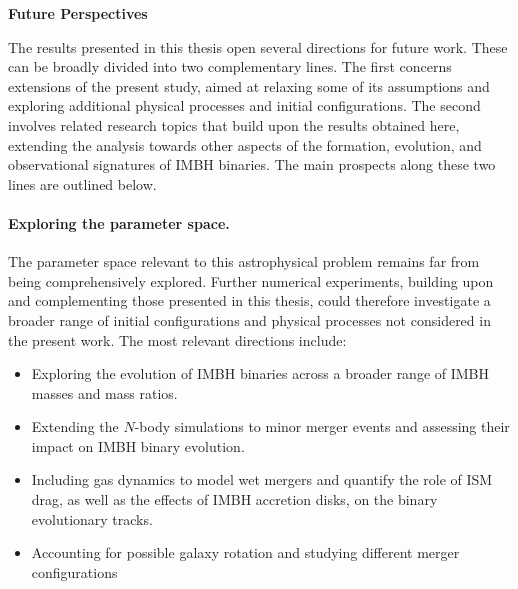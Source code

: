 \documentclass[12pt,twoside,openany]{book}
\begin{document}
\begin{center}
\textbf{Future Perspectives}
\end{center}
The results presented in this thesis open several directions for future work. These can be broadly divided into two complementary lines. The first concerns extensions of the present study, aimed at relaxing some of its assumptions and exploring additional physical processes and initial configurations. The second involves related research topics that build upon the results obtained here, extending the analysis towards other aspects of the formation, evolution, and observational signatures of IMBH binaries. The main prospects along these two lines are outlined below.
\paragraph{Exploring the parameter space.}
The parameter space relevant to this astrophysical problem remains far from being comprehensively explored. Further numerical experiments, building upon and complementing those presented in this thesis, could therefore investigate a broader range of initial configurations and physical processes not considered in the present work. The most relevant directions include:
\begin{itemize}
\item Exploring the evolution of IMBH binaries across a broader range of IMBH masses and mass ratios.
\item Extending the $N$-body simulations to minor merger events and assessing their impact on IMBH binary evolution.
\item Including gas dynamics to model wet mergers and quantify the role of ISM drag, as well as the effects of IMBH accretion disks, on the binary evolutionary tracks.
\item Accounting for possible galaxy rotation and studying different merger configurations
\end{itemize}
\end{document}
